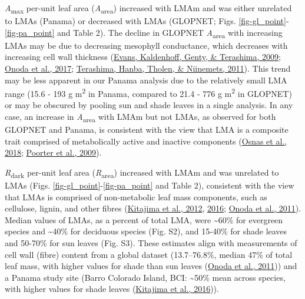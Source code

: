 \documentclass[
  12pt,
  letterpaper,
  DIV=11,
  numbers=noendperiod]{scrartcl}
\begin{document}
\emph{A}\textsubscript{max} per-unit leaf area
(\emph{A}\textsubscript{area}) increased with LMAm and was either
unrelated to LMAs (Panama) or decreased with LMAs (GLOPNET; Figs.
\ref{fig-gl_point}-\ref{fig-pa_point} and Table 2). The decline in
GLOPNET \emph{A}\textsubscript{area} with increasing LMAs may be due to
decreasing mesophyll conductance, which decreases with increasing cell
wall thickness (\protect\hyperlink{ref-Evans2009}{Evans, Kaldenhoff,
Genty, \& Terashima, 2009}; \protect\hyperlink{ref-Onoda2017}{Onoda et
al., 2017}; \protect\hyperlink{ref-Terashima2011}{Terashima, Hanba,
Tholen, \& Niinemets, 2011}). This trend may be less apparent in our
Panama analysis due to the relatively small LMA range (15.6 - 193 g
m\textsuperscript{2} in Panama, compared to 21.4 - 776 g
m\textsuperscript{2} in GLOPNET) or may be obscured by pooling sun and
shade leaves in a single analysis. In any case, an increase in
\emph{A}\textsubscript{area} with LMAm but not LMAs, as observed for
both GLOPNET and Panama, is consistent with the view that LMA is a
composite trait comprised of metabolically active and inactive
components (\protect\hyperlink{ref-Osnas2018}{Osnas et al., 2018};
\protect\hyperlink{ref-Poorter2009}{Poorter et al., 2009}).

\emph{R}\textsubscript{dark} per-unit leaf area
(\emph{R}\textsubscript{area}) increased with LMAm and was unrelated to
LMAs (Figs. \ref{fig-gl_point}-\ref{fig-pa_point} and Table 2),
consistent with the view that LMAs is comprised of non-metabolic leaf
mass components, such as cellulose, lignin, and other fibres
(\protect\hyperlink{ref-Kitajima2012}{Kitajima et al., 2012},
\protect\hyperlink{ref-Kitajima2016}{2016};
\protect\hyperlink{ref-Onoda2011}{Onoda et al., 2011}). Median values of
LMAs, as a percent of total LMA, were \textasciitilde60\% for evergreen
species and \textasciitilde40\% for deciduous species (Fig. S2), and
15-40\% for shade leaves and 50-70\% for sun leaves (Fig. S3). These
estimates align with measurements of cell wall (fibre) content from a
global dataset (13.7--76.8\%, median 47\% of total leaf mass, with
higher values for shade than sun leaves
(\protect\hyperlink{ref-Onoda2011}{Onoda et al., 2011})) and a Panama
study site (Barro Colorado Island, BCI: \textasciitilde50\% mean across
species, with higher values for shade leaves
(\protect\hyperlink{ref-Kitajima2016}{Kitajima et al., 2016})).
\end{document}
